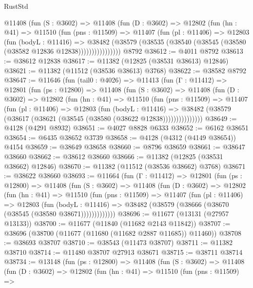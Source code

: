 \begin{lexlean}{RustStd}
\begin{coremodule}
          @11408
            (fun (S : @3602) =>
            @11408
              (fun (D : @3602) =>
              @12802
                (fun (hn : @41) =>
                @11510
                  (fun (pns : @11509) =>
                  @11407
                    (fun (pl : @11406) =>
                    @12803
                      (fun (bodyL : @11416) =>
                      @38482
                        (@38579
                          (@38535 (@38540 (@38545 (@38580 (@38582 @12836 @12838))))))))))))))))
    @8792
@38612 := @4011 @8792
@38613 := @38612 @12838
@38617 := @11382 (@12825 (@38531 @38613) @12846)
@38621 := @11382 (@11512 (@38536 @38613) @3768)
@38622 := @38582 @8792
@38647 := @11646
    (fun (tail0 : @4026) =>
    @11413
      (fun (Γ : @11412) =>
      @12801
        (fun (ps : @12800) =>
        @11408
          (fun (S : @3602) =>
          @11408
            (fun (D : @3602) =>
            @12802
              (fun (hn : @41) =>
              @11510
                (fun (pns : @11509) =>
                @11407
                  (fun (pl : @11406) =>
                  @12803
                    (fun (bodyL : @11416) =>
                    @38482 (@38579 (@38617 (@38621 (@38545 (@38580 (@38622 @12838)))))))))))))))
@38649 := @4128 (@4291 @8932)
@38651 := @4027 @8828 @6333
@38652 := @6162 @38651
@38654 := @6435 @38652 @3739
@38658 := @4128 (@4312 (@4149 @38654)) @4154
@38659 := @38649 @38658
@38660 := @8796 @38659
@38661 := @38647 @38660
@38662 := @38612 @38660
@38666 := @11382 (@12825 (@38531 @38662) @12846)
@38670 := @11382 (@11512 (@38536 @38662) @3768)
@38671 := @38622 @38660
@38693 := @11664
    (fun (Γ : @11412) =>
    @12801
      (fun (ps : @12800) =>
      @11408
        (fun (S : @3602) =>
        @11408
          (fun (D : @3602) =>
          @12802
            (fun (hn : @41) =>
            @11510
              (fun (pns : @11509) =>
              @11407
                (fun (pl : @11406) =>
                @12803
                  (fun (bodyL : @11416) =>
                  @38482 (@38579 (@38666 (@38670 (@38545 (@38580 @38671)))))))))))))
@38696 := @11677 (@13131 (@27957 @13133))
@38700 := @11677 (@11840 (@11682 @2143 @11842))
@38707 := @38696 (@38700 (@11677 (@11680 (@11682 @2887 @11685)) @11460))
@38708 := @38693 @38707
@38710 := @38543 (@11473 @38707)
@38711 := @11382 @38710
@38714 := @11480 @38707 @27913 @38671
@38715 := @38711 @38714
@38734 := @13148
    (fun (ps : @12800) =>
    @11408
      (fun (S : @3602) =>
      @11408
        (fun (D : @3602) =>
        @12802
          (fun (hn : @41) =>
          @11510
            (fun (pns : @11509) =>

\end{coremodule}
\end{lexlean}

